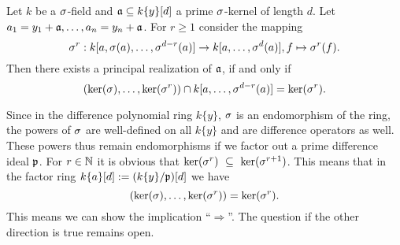 \begin{conj}
Let $k$ be a $\sigma$-field and $\mathfrak{a} \subseteq k\{y\}[d]$ a prime $\sigma$-kernel of length $d$.
Let $a_1 = y_1 + \mathfrak{a} ,\ldots,a_n = y_n + \mathfrak{a}$.
For $r \geq 1$ consider the mapping 
\[ \sigma^r : k[a,\sigma(a),\ldots,\sigma^{d-r}(a)] \rightarrow k[a,\ldots,\sigma^{d}(a)], f \mapsto \sigma^r(f). \]
Then there exists a principal realization of $\mathfrak{a}$, if and only if 
\begin{equation*} (\operatorname{ker}(\sigma),\ldots,\operatorname{ker}(\sigma^r)) \cap k[a,\ldots,\sigma^{d-r}(a)] = \operatorname{ker}(\sigma^r). \end{equation*}
\end{conj}

Since in the difference polynomial ring $k\{y\}$, $\sigma$ is an endomorphism of the ring, the powers of $\sigma$ are well-defined on all $k\{y\}$ and are difference operators as well.
These powers thus remain endomorphisms if we factor out a prime difference ideal $\mathfrak{p}$.
For $r \in \mathbb{N}$ it is obvious that $\operatorname{ker}(\sigma^r)~\subseteq~\operatorname{ker}(\sigma^{r+1})$. This means that in the factor ring $k\{a\}[d] := (k\{y\}/\mathfrak{p})[d]$ we
have $$(\operatorname{ker}(\sigma),\ldots,\operatorname{ker}(\sigma^r)) = \operatorname{ker}(\sigma^r).$$ This means we can show the implication ``$\Rightarrow$''. The question if the other direction is true remains open.




